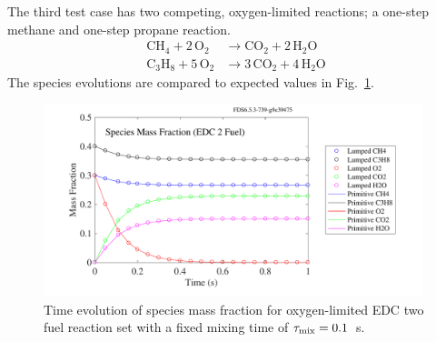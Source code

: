 \documentclass[11pt]{book}
\begin{document}
The third test case has two competing, oxygen-limited reactions; a one-step methane and one-step propane reaction.
\begin{align}\label{eq:2step_o2_lim}
\mathrm{CH_4 + 2 \, O_2} &\rightarrow  \mathrm{CO_2 + 2 \, H_2O} \\
\nonumber \mathrm{C_3H_8 + 5 \, O_2} &\rightarrow \mathrm{3 \,CO_2 + 4 \, H_2O}
\end{align}
The species evolutions are compared to expected values in Fig.~\ref{fig:EDC_2Step_ox}.

\begin{figure}[!ht]
\centering
\includegraphics[height=2.2in]{SCRIPT_FIGURES/reactionrate_EDC_O2lim_2fuel}
\caption[Species evolution in two parallel EDC reactions]{Time evolution of species mass fraction for oxygen-limited EDC two fuel reaction set with a fixed mixing time of $\tau_{\rm mix}=0.1$~s.}
\label{fig:EDC_2Step_ox}
\end{figure}
\end{document}
